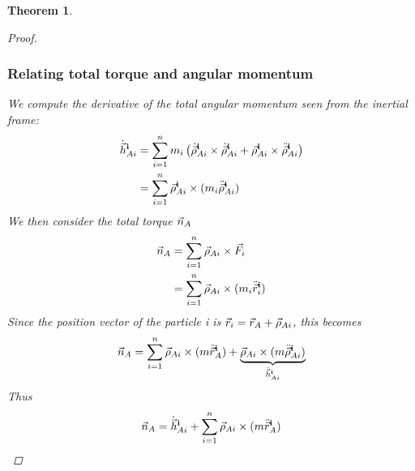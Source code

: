 \documentclass{article}
\newtheorem{theorem}{Theorem}
\begin{document}
\begin{theorem}
\begin{proof}
        \subsubsection*{Relating total torque and angular momentum}
        We compute the derivative of the total angular momentum seen from the inertial frame:
        \begin{align*}
            \dot{\vec{h}}_{Ai}^{\mathbf{i}} &= \sum_{i=1}^nm_i\left(\dot{\vec{\rho}}_{Ai}^{\mathbf{i}}\times\dot{\vec{\rho}}_{Ai}^{\mathbf{i}} +{\vec{\rho}}_{Ai}^{\mathbf{i}}\times \ddot{\vec{\rho}}_{Ai}^{\mathbf{i}}\right)
            \\ &= \sum_{i=1}^n\vec{\rho}_{Ai}^{\mathbf{i}} \times (m_i\ddot{\vec{\rho}}_{Ai}^{\mathbf{i}})
        \end{align*}
        We then consider the total torque $\vec{n}_A$
        \begin{align*}
            \vec{n}_A &= \sum_{i=1}^n\vec{\rho}_{Ai}\times\vec{F}_i\\
            &=\sum_{i=1}^n\vec{\rho}_{Ai}\times(m_i\ddot{\vec{r}}_i^{\mathbf{i}}) \\
        \end{align*}
        Since the position vector of the particle i is $\vec{r}_i = \vec{r}_A + \vec{\rho}_{Ai}$, this becomes
        \begin{align*}
            \vec{n}_A = \sum_{i=1}^n \vec{\rho}_{Ai} \times (m\ddot{\vec{r}}_A^{\mathbf{i}})
            + \underbrace{\vec{\rho}_{Ai} \times (m\ddot{\vec{\rho}}_{Ai}^{\mathbf{i}})}_{\dot{\vec{h}}_{Ai}^{\mathbf{i}}}
        \end{align*}
        Thus
        \begin{align*}
            \vec{n}_A = \dot{\vec{h}}_{Ai}^{\mathbf{i}} + \sum_{i=1}^n \vec{\rho}_{Ai} \times (m\ddot{\vec{r}}_A^{\mathbf{i}})
        \end{align*}
        


        
    \end{proof}
\end{theorem}
\end{document}
